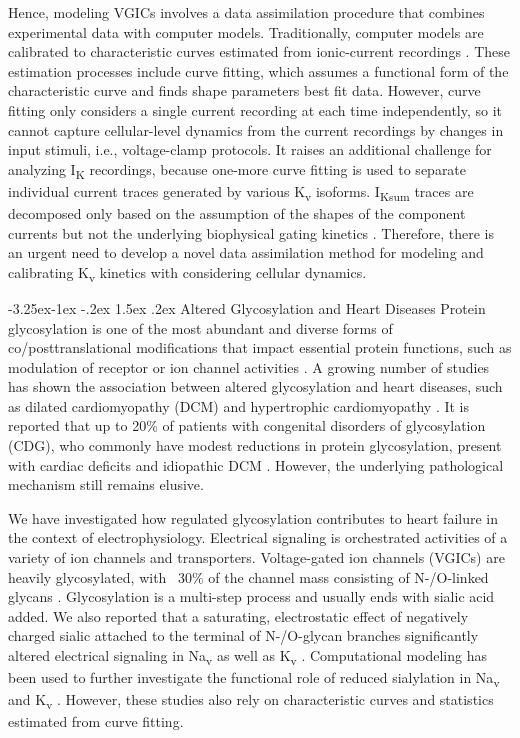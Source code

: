 \documentclass[11pt]{article}
\makeatletter
\renewcommand\subsection{\@startsection{subsection}{2}{\z@}%
                                     {-3.25ex\@plus -1ex \@minus -.2ex}%
                                     {1.5ex \@plus .2ex}%
                                     {\normalfont\fontfamily{phv}\fontsize{14}{17}\bfseries}}
\makeatother
\begin{document}
Hence, modeling VGICs involves a data assimilation procedure that combines experimental data with computer models. Traditionally, computer models are calibrated to characteristic curves estimated from ionic-current recordings \citep{colman2018description}. These estimation processes include curve fitting, which assumes a functional form of the characteristic curve and finds shape parameters best fit data. However, curve fitting only considers a single current recording at each time independently, so it cannot capture cellular-level dynamics from the current recordings by changes in input stimuli, i.e., voltage-clamp protocols. It raises an additional challenge for analyzing I\textsubscript{K} recordings, because one-more curve fitting is used to separate individual current traces generated by various K\textsubscript{v} isoforms. I\textsubscript{Ksum} traces are decomposed only based on the assumption of the shapes of the component currents but not the underlying biophysical gating kinetics \citep{kim2022simulation}. Therefore, there is an urgent need to develop a novel data assimilation method for modeling and calibrating K\textsubscript{v} kinetics with considering cellular dynamics.

\subsection{Altered Glycosylation and Heart Diseases}
Protein glycosylation is one of the most abundant and diverse forms of co/posttranslational modifications that impact essential protein functions, such as modulation of receptor or ion channel activities \citep{ohtsubo2006glycosylation,ednie2012modulation}. A growing number of studies has shown the association between altered glycosylation and heart diseases, such as dilated cardiomyopathy (DCM) and hypertrophic cardiomyopathy \citep{ohtsubo2006glycosylation,ednie2019reduced2}. It is reported that up to 20\% of patients with congenital disorders of glycosylation (CDG), who commonly have modest reductions in protein glycosylation, present with cardiac deficits and idiopathic DCM \citep{marques2017cardiac}. However, the underlying pathological mechanism still remains elusive. 

We have investigated how regulated glycosylation contributes to heart failure in the context of electrophysiology. Electrical signaling is orchestrated activities of a variety of ion channels and transporters. Voltage-gated ion channels (VGICs) are heavily glycosylated, with ~30\% of the channel mass consisting of N-/O-linked glycans \citep{ednie2012modulation}. Glycosylation is a multi-step process and usually ends with sialic acid added. We also reported that a saturating, electrostatic effect of negatively charged sialic attached to the terminal of N-/O-glycan branches significantly altered electrical signaling in Na\textsubscript{v} \citep{ednie2013sialicNav1,ednie2015sialicNav2} as well as K\textsubscript{v} \citep{ednie2015sialicKv}. Computational modeling has been used to further investigate the functional role of reduced sialylation in Na\textsubscript{v} and K\textsubscript{v} \citep{du2015statistical, du2017silico}. However, these studies also rely on characteristic curves and statistics estimated from curve fitting. 
\end{document}
